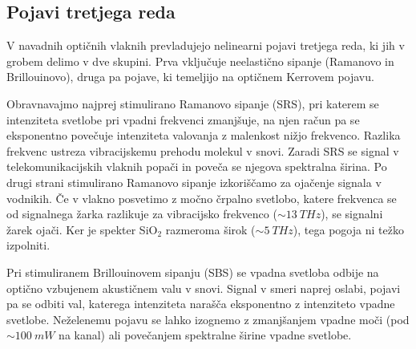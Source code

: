 \subsection*{Pojavi tretjega reda}
V navadnih optičnih vlaknih  
prevladujejo nelinearni pojavi tretjega reda, ki jih v grobem delimo v dve skupini. Prva vključuje
neelastično sipanje (Ramanovo in Brillouinovo), druga pa pojave, ki 
temeljijo na optičnem Kerrovem pojavu.

Obravnavajmo najprej stimulirano Ramanovo sipanje 
(SRS), pri katerem se intenziteta 
svetlobe pri vpadni frekvenci zmanjšuje, na njen račun pa se eksponentno povečuje 
intenziteta valovanja z malenkost nižjo frekvenco. Razlika frekvenc ustreza
vibracijskemu prehodu molekul v snovi. Zaradi SRS se signal v telekomunikacijskih vlaknih 
popači in poveča se njegova spektralna širina. Po drugi strani stimulirano Ramanovo sipanje 
izkoriščamo za ojačenje signala v vodnikih. Če v vlakno posvetimo z močno črpalno
svetlobo, katere frekvenca se od signalnega žarka razlikuje za vibracijsko frekvenco
($\sim 13~\si{THz}$), se signalni žarek ojači. Ker je spekter SiO$_2$ razmeroma 
širok ($\sim 5~\si{THz}$), tega pogoja ni težko izpolniti. 

Pri stimuliranem Brillouinovem sipanju (SBS) se vpadna svetloba
 odbije na 
optično vzbujenem akustičnem valu v snovi. Signal
v smeri naprej oslabi, pojavi pa se odbiti val, katerega intenziteta
narašča eksponentno z intenziteto vpadne svetlobe. 
Neželenemu pojavu se lahko izognemo z zmanjšanjem vpadne
moči (pod $\sim 100~\si{mW}$ na kanal) 
ali povečanjem spektralne širine vpadne svetlobe.

